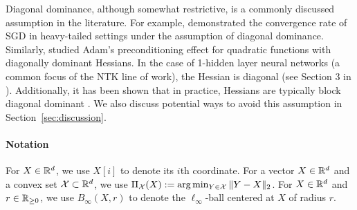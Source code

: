 Diagonal dominance, although somewhat restrictive, is a commonly discussed assumption in the literature. For example, \cite{wang2021convergence}  demonstrated the convergence rate of SGD in heavy-tailed settings under  
the assumption of diagonal dominance. Similarly, \cite{das2024towards}  studied Adam’s preconditioning effect for quadratic functions with diagonally dominant Hessians.  
In the case of 1-hidden layer neural networks (a common focus of the NTK line of work), the Hessian is diagonal (see Section 3 in \cite{liu2020linearity}). Additionally, it has been shown that in  
practice, Hessians are typically block diagonal dominant  
\cite{martens2015optimizing, botev2017practical}.  
We also discuss potential ways to avoid this assumption in  
Section~\ref{sec:discussion}.



\paragraph{Notation}
For $X\in\mathbb{R}^d$, we use $X[i]$ to denote its $i$th coordinate.
For a vector $X\in\mathbb{R}^d$ and a convex set $\mathcal{X}\subset\mathbb{R}^d$, we use $\Pi_{\mathcal{X}}(X):=\arg\min_{Y\in\mathcal{X}}\|Y-X\|_2$.
For $X\in\mathbb{R}^d$ and $r\in\mathbb{R}_{\ge0}$, we use $B_\infty(X,r)$ to denote the $\ell_\infty$-ball centered at $X$ of radius $r$.